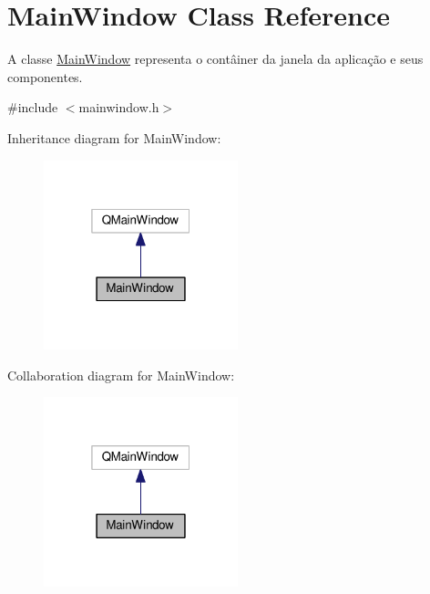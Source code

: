 \hypertarget{class_main_window}{}\section{Main\+Window Class Reference}
\label{class_main_window}


A classe \hyperlink{class_main_window}{Main\+Window} representa o contâiner da janela da aplicação e seus componentes.  




{\ttfamily \#include $<$mainwindow.\+h$>$}



Inheritance diagram for Main\+Window\+:
\nopagebreak
\begin{figure}[H]
\begin{center}
\leavevmode
\includegraphics[width=160pt]{class_main_window__inherit__graph}
\end{center}
\end{figure}


Collaboration diagram for Main\+Window\+:
\nopagebreak
\begin{figure}[H]
\begin{center}
\leavevmode
\includegraphics[width=160pt]{class_main_window__coll__graph}
\end{center}
\end{figure}
